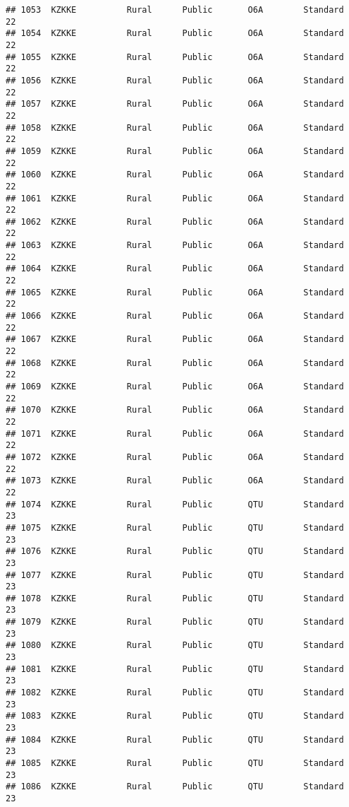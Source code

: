 \documentclass[
]{article}
\begin{document}
\begin{verbatim}
## 1053  KZKKE          Rural      Public       O6A        Standard        22
## 1054  KZKKE          Rural      Public       O6A        Standard        22
## 1055  KZKKE          Rural      Public       O6A        Standard        22
## 1056  KZKKE          Rural      Public       O6A        Standard        22
## 1057  KZKKE          Rural      Public       O6A        Standard        22
## 1058  KZKKE          Rural      Public       O6A        Standard        22
## 1059  KZKKE          Rural      Public       O6A        Standard        22
## 1060  KZKKE          Rural      Public       O6A        Standard        22
## 1061  KZKKE          Rural      Public       O6A        Standard        22
## 1062  KZKKE          Rural      Public       O6A        Standard        22
## 1063  KZKKE          Rural      Public       O6A        Standard        22
## 1064  KZKKE          Rural      Public       O6A        Standard        22
## 1065  KZKKE          Rural      Public       O6A        Standard        22
## 1066  KZKKE          Rural      Public       O6A        Standard        22
## 1067  KZKKE          Rural      Public       O6A        Standard        22
## 1068  KZKKE          Rural      Public       O6A        Standard        22
## 1069  KZKKE          Rural      Public       O6A        Standard        22
## 1070  KZKKE          Rural      Public       O6A        Standard        22
## 1071  KZKKE          Rural      Public       O6A        Standard        22
## 1072  KZKKE          Rural      Public       O6A        Standard        22
## 1073  KZKKE          Rural      Public       O6A        Standard        22
## 1074  KZKKE          Rural      Public       QTU        Standard        23
## 1075  KZKKE          Rural      Public       QTU        Standard        23
## 1076  KZKKE          Rural      Public       QTU        Standard        23
## 1077  KZKKE          Rural      Public       QTU        Standard        23
## 1078  KZKKE          Rural      Public       QTU        Standard        23
## 1079  KZKKE          Rural      Public       QTU        Standard        23
## 1080  KZKKE          Rural      Public       QTU        Standard        23
## 1081  KZKKE          Rural      Public       QTU        Standard        23
## 1082  KZKKE          Rural      Public       QTU        Standard        23
## 1083  KZKKE          Rural      Public       QTU        Standard        23
## 1084  KZKKE          Rural      Public       QTU        Standard        23
## 1085  KZKKE          Rural      Public       QTU        Standard        23
## 1086  KZKKE          Rural      Public       QTU        Standard        23

\end{verbatim}
\end{document}
